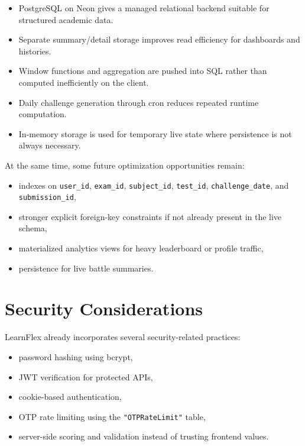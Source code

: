 \documentclass[12pt,a4paper]{article}
\begin{document}
\begin{itemize}[leftmargin=1.5em]
  \item PostgreSQL on Neon gives a managed relational backend suitable for structured academic data.
  \item Separate summary/detail storage improves read efficiency for dashboards and histories.
  \item Window functions and aggregation are pushed into SQL rather than computed inefficiently on the client.
  \item Daily challenge generation through cron reduces repeated runtime computation.
  \item In-memory storage is used for temporary live state where persistence is not always necessary.
\end{itemize}

At the same time, some future optimization opportunities remain:

\begin{itemize}[leftmargin=1.5em]
  \item indexes on \texttt{user\_id}, \texttt{exam\_id}, \texttt{subject\_id}, \texttt{test\_id}, \texttt{challenge\_date}, and \texttt{submission\_id},
  \item stronger explicit foreign-key constraints if not already present in the live schema,
  \item materialized analytics views for heavy leaderboard or profile traffic,
  \item persistence for live battle summaries.
\end{itemize}

\section{Security Considerations}
LearnFlex already incorporates several security-related practices:

\begin{itemize}[leftmargin=1.5em]
  \item password hashing using bcrypt,
  \item JWT verification for protected APIs,
  \item cookie-based authentication,
  \item OTP rate limiting using the \texttt{"OTPRateLimit"} table,
  \item server-side scoring and validation instead of trusting frontend values.
\end{itemize}
\end{document}
